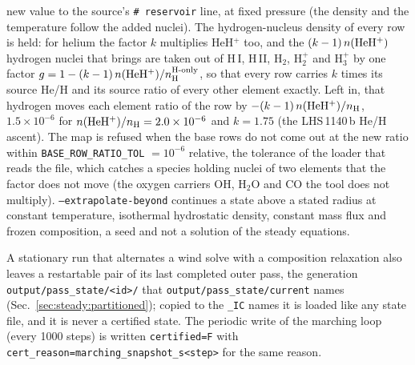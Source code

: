 new value to the source's \texttt{\# reservoir} line, at fixed pressure (the
density and the temperature follow the added nuclei).  The hydrogen-nucleus
density of every row is held: for helium the factor $k$ multiplies HeH$^+$
too, and the $(k-1)\,n({\rm HeH^+})$ hydrogen nuclei that brings are taken
out of H\,I, H\,II, H$_2$, H$_2^+$ and H$_3^+$ by one factor
$g = 1-(k-1)\,n({\rm HeH^+})/n_{\rm H}^{\rm H\text{-}only}$, so that every
row carries $k$ times its source He/H and its source ratio of every other
element exactly.  Left in, that hydrogen moves each element ratio of the row
by $-(k-1)\,n({\rm HeH^+})/n_{\rm H}$, $1.5\times10^{-6}$ for
$n({\rm HeH^+})/n_{\rm H}=2.0\times10^{-6}$ and $k=1.75$ (the LHS\,1140\,b
He/H ascent).  The map is refused when the base rows do not come out at the
new ratio within \texttt{BASE\_ROW\_RATIO\_TOL} $=10^{-6}$ relative, the
tolerance of the loader that reads the file, which catches a species holding
nuclei of two elements that the factor does not move (the oxygen carriers
OH, H$_2$O and CO the tool does not multiply).
\texttt{--extrapolate-beyond} continues a state above a stated radius at
constant temperature, isothermal hydrostatic density, constant mass flux and
frozen composition, a seed and not a solution of the steady equations.

A stationary run that alternates a wind solve with a composition relaxation
also leaves a restartable pair of its last completed outer pass, the
generation \texttt{output/pass\_state/<id>/} that
\texttt{output/pass\_state/current} names
(Sec.~\ref{sec:steady:partitioned}); copied to the \texttt{\_IC} names it is
loaded like any state file, and it is never a certified state.  The periodic
write of the marching loop (every 1000 steps) is written \texttt{certified=F}
with \texttt{cert\_reason=marching\_snapshot\_s<step>} for the same reason.
